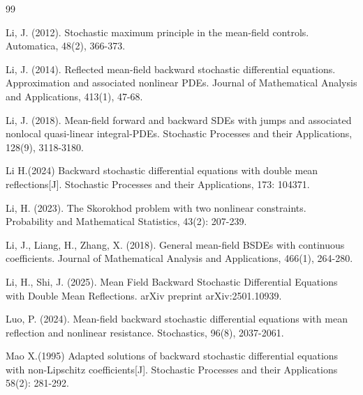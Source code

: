 \documentclass[10pt]{article}%
\numberwithin{equation}{section}
\begin{document}
\begin{thebibliography}{99}

  Li, J. (2012). Stochastic maximum principle in the mean-field controls. Automatica, 48(2), 366-373.

  Li, J. (2014). Reflected mean-field backward stochastic differential equations. Approximation and associated nonlinear PDEs. Journal of Mathematical Analysis and Applications, 413(1), 47-68.
 
  Li, J. (2018). Mean-field forward and backward SDEs with jumps and associated nonlocal quasi-linear integral-PDEs. Stochastic Processes and their Applications, 128(9), 3118-3180.
 
  Li H.(2024) Backward stochastic differential equations with double mean reflections[J]. Stochastic Processes and their Applications, 173: 104371.
 
 Li, H. (2023).  The Skorokhod problem with two nonlinear constraints. Probability and Mathematical Statistics, 43(2): 207-239.

 Li, J., Liang, H., Zhang, X. (2018). General mean-field BSDEs with continuous coefficients. Journal of Mathematical Analysis and Applications, 466(1), 264-280.

 Li, H., Shi, J. (2025). Mean Field Backward Stochastic Differential Equations with Double Mean Reflections. arXiv preprint arXiv:2501.10939.

 Luo, P. (2024). Mean-field backward stochastic differential equations with mean reflection and nonlinear resistance. Stochastics, 96(8), 2037-2061.

 Mao X.(1995) Adapted solutions of backward stochastic differential equations with non-Lipschitz coefficients[J]. Stochastic Processes and their Applications 58(2): 281-292.
 






\end{thebibliography}
\end{document}
